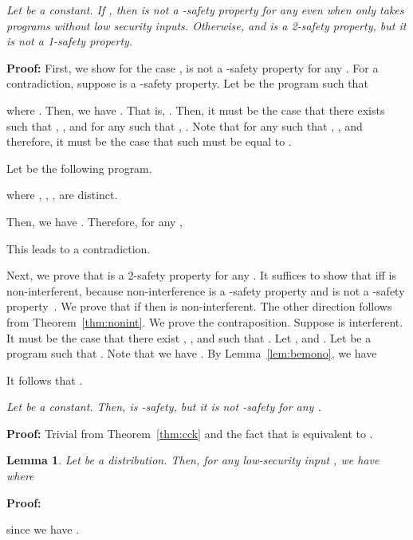 \documentclass{llncs}
\newtheorem{lemma}[theorem]{Lemma}
\newenvironment{proof}{\noindent\rm{\bf Proof:}}{\hbox{}\vspace*{0.2\baselineskip}}
\newenvironment{reftheorem}[1]{\begin{trivlist}\item[\hskip
      \labelsep{\bf Theorem #1.}]\it}{\end{trivlist}}
\begin{document}
\begin{reftheorem}{\ref{thm:be2nk1}}
  Let  be a constant.  If , then  is not a
  -safety property for any  even when  only
  takes programs without low security inputs.  Otherwise,  and
   is a 2-safety property, but it is not a 1-safety
  property.
\end{reftheorem}
\begin{proof}
First, we show for the case ,  is not a
-safety property for any .  For a contradiction, suppose
 is a -safety property.  Let  be the program such
that

where .  Then, we have .  That is, .  Then, it must be the case that there exists  such
that , , and for any  such that
, .  Note that
for any  such that ,
, and therefore, it must be
the case that such  must be equal to .

Let  be the following program.

where , , ,  are distinct.

Then, we have .  Therefore, for any ,

This leads to a contradiction.

Next, we prove that  is a 2-safety property for any
.  It suffices to show that  iff  is non-interferent, because
non-interference is a -safety property and is not a -safety
property~\cite{mclean:sp94,barthe:csfw04,darvas:spc05}.  We prove that
if  then  is
non-interferent.  The other direction follows from
Theorem~\ref{thm:nonint}.  We prove the contraposition.  Suppose 
is interferent.  It must be the case that there exist , ,
and  such that .  Let
, and .  Let  be a program such
that .  Note
that we have .  By
Lemma~\ref{lem:bemono}, we have
 
It follows that .
\end{proof}

\begin{reftheorem}{\ref{thm:secck}}
Let  be a constant.  Then,  is
-safety, but it is not -safety for any .
\end{reftheorem}
\begin{proof}
  Trivial from Theorem~\ref{thm:cck} and the fact that 
  is equivalent to .
\end{proof}

\begin{lemma}
\label{lem:mecclemma}
Let  be a distribution.  Then, for any low-security input ,
we have  where

\end{lemma}
\begin{proof}

since we have .
\end{proof}
\end{document}
